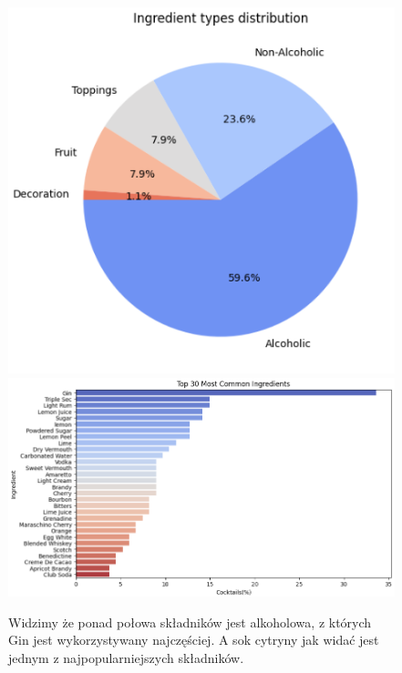\documentclass{article}
\begin{document}
\begin{figure}[h]
\centering
    \includegraphics[width=0.45\linewidth]{i_p_1.png}
    \vspace{2cm}
    \includegraphics[width=0.7\linewidth]{i_p_2.png}
    \caption{Widzimy że ponad połowa składników jest alkoholowa, z których Gin jest wykorzystywany najczęściej. A sok cytryny jak widać jest jednym z najpopularniejszych składników.}
\end{figure}
\end{document}
